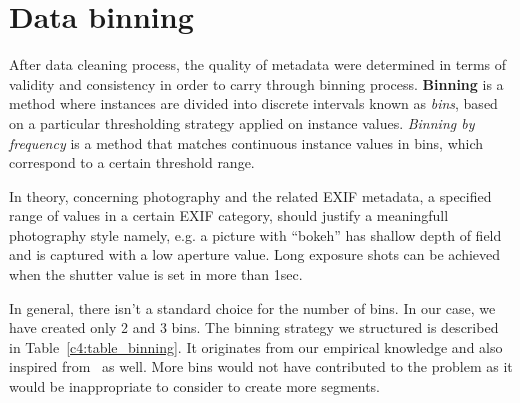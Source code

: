 




\section{Data binning}
\label{c4:binning}

After data cleaning process, the quality of metadata were determined in terms of validity and consistency in order to carry through binning process. 
\textbf{Binning} is a method where instances are divided into discrete intervals known as \textit{bins}, based on a particular thresholding strategy applied on instance values.
\textit{Binning by frequency} is a method that matches continuous instance values  in bins, which correspond to a certain threshold range.


In theory, concerning photography and the related EXIF metadata, a specified range of values in a certain EXIF category, should justify a meaningfull photography style namely, e.g. a picture with ``bokeh'' has shallow depth of field and is captured with a low aperture value. Long exposure shots can be achieved when the shutter value is set in more than 1sec.

In general, there isn't a standard choice for the number of bins. In our case, we have created only 2 and 3 bins.
The binning strategy we structured is described in Table~\ref{c4:table_binning}. It originates from our empirical knowledge and also inspired from~\cite{laurence2018camera} as well.
More bins would not have contributed to the problem as it would be inappropriate to consider to create more segments.

